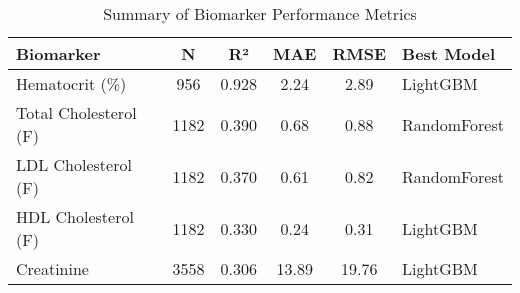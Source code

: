 \documentclass[11pt,a4paper]{article}
\begin{document}
\begin{table}[ht]
    \centering
    \caption{Summary of Biomarker Performance Metrics}
    \label{tab:performance_summary}
    \begin{tabular}{lccccl}
        \toprule
        \textbf{Biomarker} & \textbf{N} & \textbf{R²} & \textbf{MAE} & \textbf{RMSE} & \textbf{Best Model} \\
        \midrule
        Hematocrit (\%) & 956 & 0.928 & 2.24 & 2.89 & LightGBM \\
        Total Cholesterol (F) & 1182 & 0.390 & 0.68 & 0.88 & RandomForest \\
        LDL Cholesterol (F) & 1182 & 0.370 & 0.61 & 0.82 & RandomForest \\
        HDL Cholesterol (F) & 1182 & 0.330 & 0.24 & 0.31 & LightGBM \\
        Creatinine & 3558 & 0.306 & 13.89 & 19.76 & LightGBM \\
        \bottomrule
    \end{tabular}
\end{table}
\end{document}
